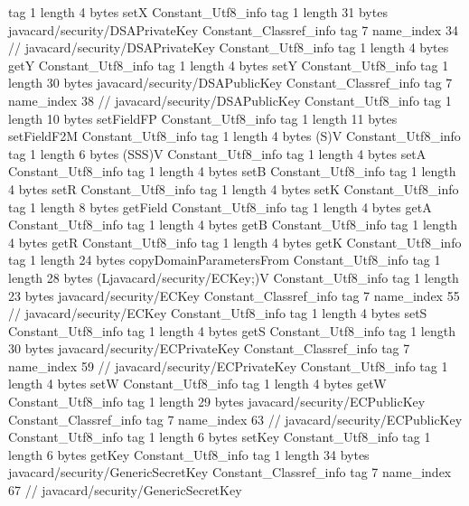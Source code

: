 {{{			tag	1
			length	4
			bytes	setX
		}
		Constant_Utf8_info {
			tag	1
			length	31
			bytes	javacard/security/DSAPrivateKey
		}
		Constant_Classref_info {
			tag	7
			name_index	34		// javacard/security/DSAPrivateKey
		}
		Constant_Utf8_info {
			tag	1
			length	4
			bytes	getY
		}
		Constant_Utf8_info {
			tag	1
			length	4
			bytes	setY
		}
		Constant_Utf8_info {
			tag	1
			length	30
			bytes	javacard/security/DSAPublicKey
		}
		Constant_Classref_info {
			tag	7
			name_index	38		// javacard/security/DSAPublicKey
		}
		Constant_Utf8_info {
			tag	1
			length	10
			bytes	setFieldFP
		}
		Constant_Utf8_info {
			tag	1
			length	11
			bytes	setFieldF2M
		}
		Constant_Utf8_info {
			tag	1
			length	4
			bytes	(S)V
		}
		Constant_Utf8_info {
			tag	1
			length	6
			bytes	(SSS)V
		}
		Constant_Utf8_info {
			tag	1
			length	4
			bytes	setA
		}
		Constant_Utf8_info {
			tag	1
			length	4
			bytes	setB
		}
		Constant_Utf8_info {
			tag	1
			length	4
			bytes	setR
		}
		Constant_Utf8_info {
			tag	1
			length	4
			bytes	setK
		}
		Constant_Utf8_info {
			tag	1
			length	8
			bytes	getField
		}
		Constant_Utf8_info {
			tag	1
			length	4
			bytes	getA
		}
		Constant_Utf8_info {
			tag	1
			length	4
			bytes	getB
		}
		Constant_Utf8_info {
			tag	1
			length	4
			bytes	getR
		}
		Constant_Utf8_info {
			tag	1
			length	4
			bytes	getK
		}
		Constant_Utf8_info {
			tag	1
			length	24
			bytes	copyDomainParametersFrom
		}
		Constant_Utf8_info {
			tag	1
			length	28
			bytes	(Ljavacard/security/ECKey;)V
		}
		Constant_Utf8_info {
			tag	1
			length	23
			bytes	javacard/security/ECKey
		}
		Constant_Classref_info {
			tag	7
			name_index	55		// javacard/security/ECKey
		}
		Constant_Utf8_info {
			tag	1
			length	4
			bytes	setS
		}
		Constant_Utf8_info {
			tag	1
			length	4
			bytes	getS
		}
		Constant_Utf8_info {
			tag	1
			length	30
			bytes	javacard/security/ECPrivateKey
		}
		Constant_Classref_info {
			tag	7
			name_index	59		// javacard/security/ECPrivateKey
		}
		Constant_Utf8_info {
			tag	1
			length	4
			bytes	setW
		}
		Constant_Utf8_info {
			tag	1
			length	4
			bytes	getW
		}
		Constant_Utf8_info {
			tag	1
			length	29
			bytes	javacard/security/ECPublicKey
		}
		Constant_Classref_info {
			tag	7
			name_index	63		// javacard/security/ECPublicKey
		}
		Constant_Utf8_info {
			tag	1
			length	6
			bytes	setKey
		}
		Constant_Utf8_info {
			tag	1
			length	6
			bytes	getKey
		}
		Constant_Utf8_info {
			tag	1
			length	34
			bytes	javacard/security/GenericSecretKey
		}
		Constant_Classref_info {
			tag	7
			name_index	67		// javacard/security/GenericSecretKey
}}}
